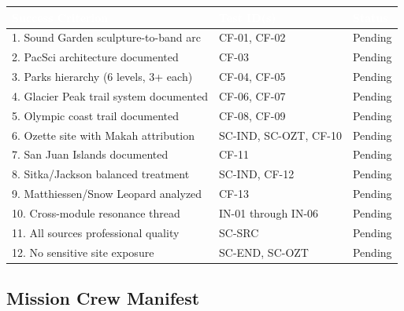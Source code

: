 \documentclass[11pt,letterpaper]{article}
\newcommand{\tableheader}[1]{\textbf{\sffamily\textcolor{white}{#1}}}
\begin{document}
\begin{center}
\begin{tabularx}{\textwidth}{XL{3.5cm}C{1.5cm}}
\toprule
{}
\tableheader{Success Criterion} & \tableheader{Test ID(s)} & \tableheader{Status} \\
. Sound Garden sculpture-to-band arc & CF-01, CF-02 & Pending \\
2. PacSci architecture documented & CF-03 & Pending \\
3. Parks hierarchy (6 levels, 3+ each) & CF-04, CF-05 & Pending \\
4. Glacier Peak trail system documented & CF-06, CF-07 & Pending \\
5. Olympic coast trail documented & CF-08, CF-09 & Pending \\
6. Ozette site with Makah attribution & SC-IND, SC-OZT, CF-10 & Pending \\
7. San Juan Islands documented & CF-11 & Pending \\
8. Sitka/Jackson balanced treatment & SC-IND, CF-12 & Pending \\
9. Matthiessen/Snow Leopard analyzed & CF-13 & Pending \\
10. Cross-module resonance thread & IN-01 through IN-06 & Pending \\
11. All sources professional quality & SC-SRC & Pending \\
12. No sensitive site exposure & SC-END, SC-OZT & Pending \\
\bottomrule
\end{tabularx}
\end{center}

\subsection{Mission Crew Manifest}
\end{document}
